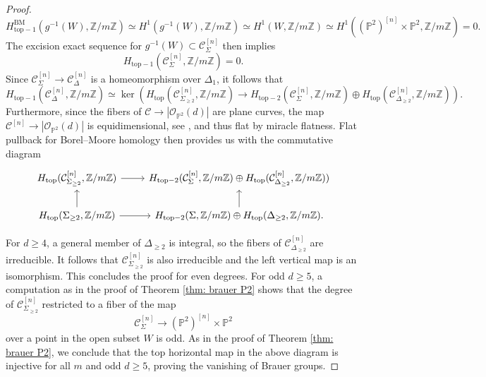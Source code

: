 \documentclass[11pt]{amsart}
\theoremstyle{plain}
\theoremstyle{definition}
\theoremstyle{remark}
\newcommand{\BM}{{\mathrm{BM}}}
\begin{document}
\begin{proof}
\small
$$H^{\BM}_{\mathrm{top}-1}(g^{-1}(W), \mathbb Z /m \mathbb Z) \simeq H^1(g^{-1}(W), \mathbb Z /m \mathbb Z) \simeq H^1(W, \mathbb Z/m \mathbb Z) \simeq H^1((\mathbb P^2)^{[n]} \times \mathbb P^2, \mathbb Z / m \mathbb Z) = 0.$$
\normalsize
The excision exact sequence for $g^{-1}(W) \subset \mathcal C^{[n]}_\Sigma$ then implies 
$$H_{\mathrm{top}-1}(\mathcal C^{[n]}_\Sigma, \mathbb Z / m \mathbb Z) = 0.$$
Since $\mathcal{C}^{[n]}_\Sigma \to \mathcal{C}^{[n]}_\Delta$ is a homeomorphism over $\Delta_1$, it follows that
$$H_{\mathrm{top}-1}(\mathcal C_{\Delta}^{[n]}, \mathbb Z / m \mathbb Z) \simeq \ker(H_{\mathrm{top}}(\mathcal C^{[n]}_{\Sigma_{\geq 2}}, \mathbb Z / m \mathbb Z) \to H_{\mathrm{top}-2}(\mathcal C^{[n]}_{\Sigma}, \mathbb Z / m \mathbb Z) \oplus H_{\mathrm{top}}(\mathcal C_{\Delta_{\geq 2}}^{[n]}, \mathbb Z /m \mathbb Z)).$$
Furthermore, since the fibers of $\mathcal C \to |\mathcal O_{\mathbb P^2}(d)|$ are plane curves, the map $\mathcal C^{[n]}\to |\mathcal O_{\mathbb P^2}(d)|$ is equidimensional, see \cite{luan2023irreduciblecomponentshilbertscheme}, and thus flat by miracle flatness. Flat pullback for Borel--Moore homology then provides us with the commutative diagram
$$\begin{tikzcd}
H_{\mathrm{top}}(\mathcal C^{[n]}_{\Sigma_{\geq 2}}, \mathbb Z / m \mathbb Z) \arrow[r] & H_{\mathrm{top}-2}(\mathcal C^{[n]}_{\Sigma}, \mathbb Z / m \mathbb Z) \oplus H_{\mathrm{top}}(\mathcal C_{\Delta_{\geq 2}}^{[n]}, \mathbb Z / m \mathbb Z)) \\
H_{\mathrm{top}}(\Sigma_{\geq 2}, \mathbb Z /m \mathbb Z) \arrow[r]\arrow[u] & H_{\mathrm{top}-2}(\Sigma, \mathbb Z /m \mathbb Z) \oplus H_{\mathrm{top}}(\Delta_{\geq 2}, \mathbb Z / m \mathbb Z) \arrow[u].
\end{tikzcd}$$

For $d\geq 4$, a general member of $\Delta_{\geq 2}$ is integral, so the fibers of $\mathcal{C}_{\Delta_{\geq 2}}^{[n]}$ are irreducible. It follows that $\mathcal{C}_{\Sigma_{\geq 2}}^{[n]}$ is also irreducible %
and the left vertical map is an isomorphism. This concludes the proof for even degrees. For odd $d \geq 5$, a computation as in the proof of Theorem \ref{thm: brauer P2} shows that the degree of $\mathcal{C}_{\Sigma_{\geq 2}}^{[n]}$ restricted to a fiber of the map
$$\mathcal C_\Sigma^{[n ]} \to (\mathbb P^2)^{[n]} \times \mathbb P^2$$
over a point in the open subset $W$ is odd. As in the proof of Theorem \ref{thm: brauer P2}, we conclude that the top horizontal map in the above diagram is injective for all $m$ and odd $d \geq 5$, proving the vanishing of Brauer groups.
\end{proof}
\end{document}
